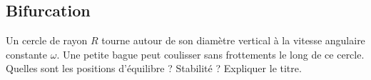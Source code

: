 \documentclass[a4paper,french,bookmarks]{book}
\begin{document}
    \subsection{Bifurcation}
    
    Un cercle de rayon $R$ tourne autour de son diamètre vertical à la vitesse angulaire constante $\omega$. Une petite bague peut coulisser sans frottements le long de ce cercle. Quelles sont les positions d'équilibre ? Stabilité ? Expliquer le titre.
    
    
    
\end{document}
